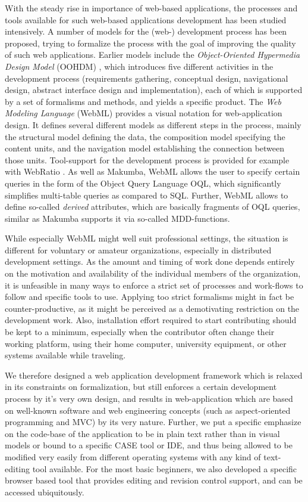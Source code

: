 \documentclass{chi2009}
\begin{document}
With the steady rise in importance of web-based applications, the processes and tools available for such web-based applications development has been studied intensively. A number of models for the (web-) development process has been proposed, trying to formalize the process with the goal of improving the quality of such web applications. Earlier models include the \textit{Object-Oriented Hypermedia Design Model} (OOHDM) \cite{schwabe1998ooa}, which introduces five different activities in the development process (requirements gathering, conceptual design, navigational design, abstract interface design and implementation), each of which is supported by a set of formalisms and methods, and yields a specific product. The \textit{Web Modeling Language} (WebML) \cite{Ceri00webmodeling} provides a visual notation for web-application design. It defines several different models as different steps in the process, mainly the structural model defining the data, the composition model specifying the content units, and the navigation model establishing the connection between those units. Tool-support for the development process is provided for example with WebRatio \cite{acerbis2004wit}. As well as Makumba, WebML allows the user to specify certain queries in the form of the Object Query Language OQL, which significantly simplifies multi-table queries as compared to SQL. Further, WebML allows to define so-called \textit{derived} attributes, which are basically fragments of OQL queries, similar as Makumba supports it via so-called MDD-functions.

While especially WebML might well suit professional settings, the situation is different for voluntary or amateur organizations, especially in distributed development settings. As the amount and timing of work done depends entirely on the motivation and availability of the individual members of the organization, it is unfeasible in many ways to enforce a strict set of processes and work-flows to follow and specific tools to use. Applying too strict formalisms might in fact be counter-productive, as it might be perceived as a demotivating restriction on the development work. Also, installation effort required to start contributing should be kept to a minimum, especially when the contributor often change their working platform, using their home computer, university equipment, or other systems available while traveling.

We therefore designed a web application development framework which is relaxed in its constraints on formalization, but still enforces a certain development process by it's very own design, and results in web-application which are based on well-known software and web engineering concepts (such as aspect-oriented programming and MVC) by its very nature. Further, we put a specific emphasize on the code-base of the application to be in plain text rather than in visual models or bound to a specific CASE tool or IDE, and thus being allowed to be modified very easily from different operating systems with any kind of text-editing tool available. For the most basic beginners, we also developed a specific browser based tool that provides editing and revision control support, and can be accessed ubiquitously.
\end{document}
